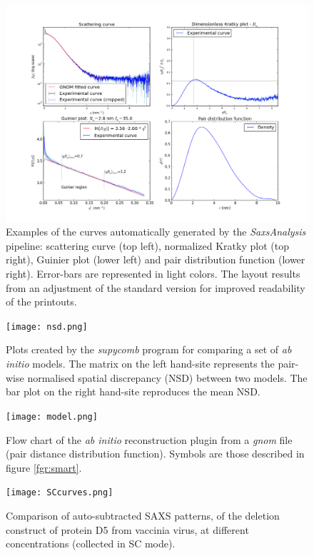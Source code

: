 \documentclass[preprint,pdf]{iucr}              %
\begin{document}
\begin{figure}
\centering
\includegraphics[width=18cm]{autoplot.png}
\caption{Examples of the curves automatically generated by the
\textit{SaxsAnalysis} pipeline: scattering curve (top left), normalized Kratky
plot (top right), Guinier plot (lower left) and pair distribution
function (lower right). 
Error-bars are represented in light colors. 
The layout results from an adjustment of the standard version for
improved readability of the printouts.}
\label{plots}
\end{figure}

\begin{figure}
\centering
\texttt{[image: nsd.png]}
\caption{Plots created by the \textit{supycomb} program for comparing a set
of \textit{ab initio} models.
The matrix on the left hand-site represents the pair-wise normalised spatial
discrepancy (NSD) between two models.
The bar plot on the right hand-site reproduces the mean NSD.}
\label{fgr:nsd}
\end{figure}

\begin{figure}
\centering
\texttt{[image: model.png]}
\caption{Flow chart of the \textit{ab initio} reconstruction plugin from a
\textit{gnom} file (pair distance distribution function).
Symbols are those described in figure \ref{fgr:smart}.}
\label{fgr:modelling}
\end{figure}

\begin{figure}
\centering
\texttt{[image: SCcurves.png]}
\caption{Comparison of auto-subtracted SAXS patterns, of the deletion
construct of protein D5 from vaccinia virus, at different concentrations
(collected in SC mode).}
\label{fgr:SCcurves}
\end{figure}
\end{document}
